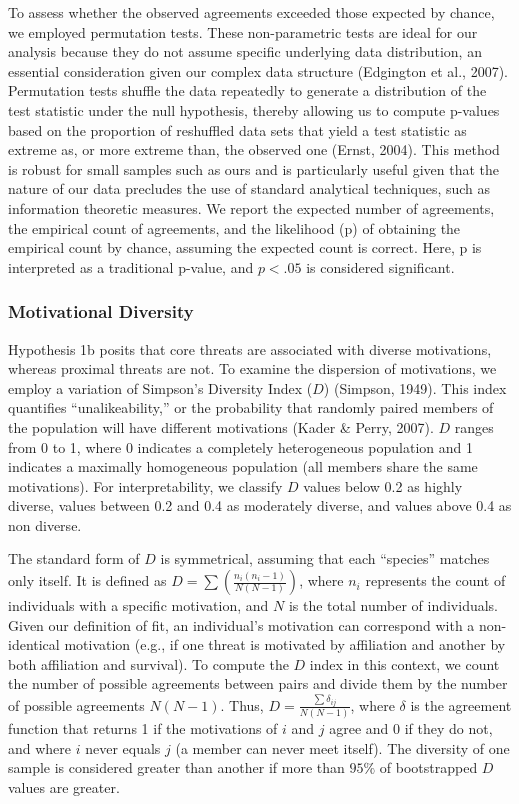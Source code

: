 \documentclass[
  man,floatsintext]{apa7}
\begin{document}
To assess whether the observed agreements exceeded those expected by chance, we employed permutation tests.
These non-parametric tests are ideal for our analysis because they do not assume specific underlying data distribution, an essential consideration given our complex data structure (Edgington et al., 2007).
Permutation tests shuffle the data repeatedly to generate a distribution of the test statistic under the null hypothesis, thereby allowing us to compute p-values based on the proportion of reshuffled data sets that yield a test statistic as extreme as, or more extreme than, the observed one (Ernst, 2004).
This method is robust for small samples such as ours and is particularly useful given that the nature of our data precludes the use of standard analytical techniques, such as information theoretic measures.
We report the expected number of agreements, the empirical count of agreements, and the likelihood (p) of obtaining the empirical count by chance, assuming the expected count is correct.
Here, p is interpreted as a traditional p-value, and \(p<.05\) is considered significant.

\subsubsection{Motivational Diversity}\label{motivational-diversity}

Hypothesis 1b posits that core threats are associated with diverse motivations, whereas proximal threats are not.
To examine the dispersion of motivations, we employ a variation of Simpson's Diversity Index (\(D\)) (Simpson, 1949).
This index quantifies ``unalikeability,'' or the probability that randomly paired members of the population will have different motivations (Kader \& Perry, 2007).
\(D\) ranges from 0 to 1, where 0 indicates a completely heterogeneous population and 1 indicates a maximally homogeneous population (all members share the same motivations).
For interpretability, we classify \(D\) values below 0.2 as highly diverse, values between 0.2 and 0.4 as moderately diverse, and values above 0.4 as non diverse.

The standard form of \(D\) is symmetrical, assuming that each ``species'' matches only itself.
It is defined as \(D = \sum \left(\frac{n_i(n_i-1)}{N(N-1)}\right)\), where \(n_i\) represents the count of individuals with a specific motivation, and \(N\) is the total number of individuals.
Given our definition of fit, an individual's motivation can correspond with a non-identical motivation (e.g., if one threat is motivated by affiliation and another by both affiliation and survival).
To compute the \(D\) index in this context, we count the number of possible agreements between pairs and divide them by the number of possible agreements \(N(N-1)\).
Thus, \(D = \frac{\sum \delta_{ij}}{N(N-1)}\), where \(\delta\) is the agreement function that returns 1 if the motivations of \(i\) and \(j\) agree and 0 if they do not, and where \(i\) never equals \(j\) (a member can never meet itself).
The diversity of one sample is considered greater than another if more than \(95\%\) of bootstrapped \(D\) values are greater.
\end{document}

